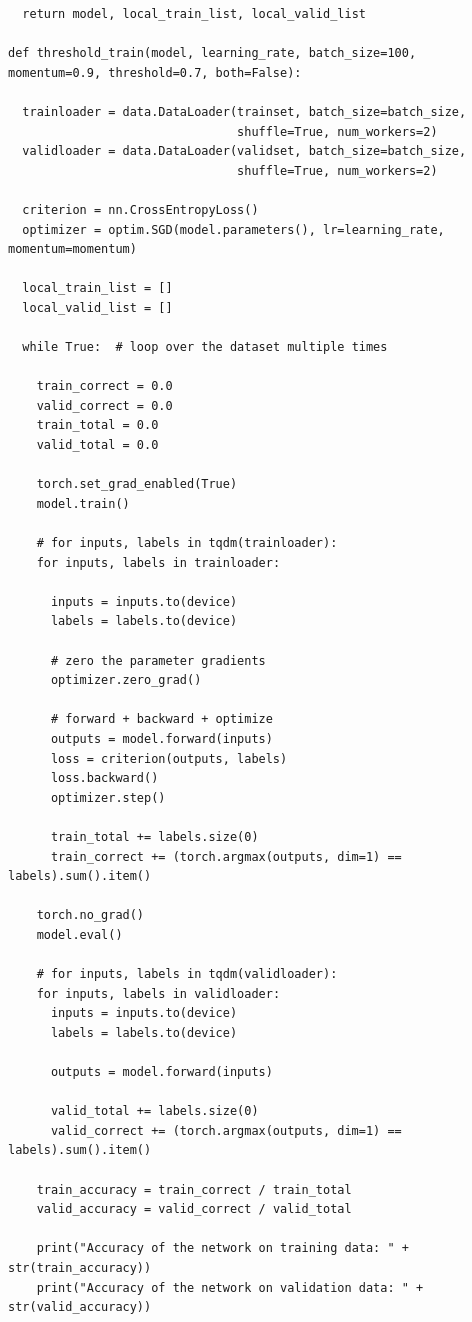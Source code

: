 \documentclass{article}
\newcommand{\1}{\mathbf{1}}
\begin{document}
{\begin{verbatim}
  return model, local_train_list, local_valid_list

def threshold_train(model, learning_rate, batch_size=100, momentum=0.9, threshold=0.7, both=False):
  
  trainloader = data.DataLoader(trainset, batch_size=batch_size,
                                shuffle=True, num_workers=2)
  validloader = data.DataLoader(validset, batch_size=batch_size,
                                shuffle=True, num_workers=2)

  criterion = nn.CrossEntropyLoss()
  optimizer = optim.SGD(model.parameters(), lr=learning_rate, momentum=momentum)

  local_train_list = []
  local_valid_list = []

  while True:  # loop over the dataset multiple times

    train_correct = 0.0
    valid_correct = 0.0
    train_total = 0.0
    valid_total = 0.0

    torch.set_grad_enabled(True)
    model.train()

    # for inputs, labels in tqdm(trainloader):
    for inputs, labels in trainloader:

      inputs = inputs.to(device)
      labels = labels.to(device)

      # zero the parameter gradients
      optimizer.zero_grad()

      # forward + backward + optimize
      outputs = model.forward(inputs)
      loss = criterion(outputs, labels)
      loss.backward()
      optimizer.step()
        
      train_total += labels.size(0)
      train_correct += (torch.argmax(outputs, dim=1) == labels).sum().item()
    
    torch.no_grad()
    model.eval()

    # for inputs, labels in tqdm(validloader):
    for inputs, labels in validloader:
      inputs = inputs.to(device)
      labels = labels.to(device)

      outputs = model.forward(inputs)
        
      valid_total += labels.size(0)
      valid_correct += (torch.argmax(outputs, dim=1) == labels).sum().item()

    train_accuracy = train_correct / train_total
    valid_accuracy = valid_correct / valid_total

    print("Accuracy of the network on training data: " + str(train_accuracy))
    print("Accuracy of the network on validation data: " + str(valid_accuracy))


\end{verbatim}}
\end{document}
